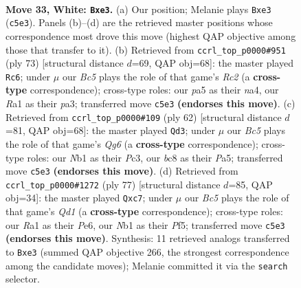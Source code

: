 \documentclass[11pt]{article}
\begin{document}
\clearpage

\begin{figure}[p]\centering
\begin{subfigure}{0.46\textwidth}\centering
\resizebox{\linewidth}{!}{%
\newchessgame
\chessboard[
  setfen={rnb1k3/8/5R2/p1Bp4/1p6/4q3/PPP3P1/RN4K1 w - - 0 33},
  showmover=false,
  pgfstyle=straightmove, color=movearrow, markmove={c5-e3}
]}
\caption{}
\end{subfigure}\hfill
\begin{subfigure}{0.46\textwidth}\centering
\resizebox{\linewidth}{!}{%
\newchessgame
\chessboard[
  setfen={8/1kr5/p5p1/3Q4/N2b1PPp/P3p2P/3P3K/5r2 b - - 7 37},
  showmover=false,
  pgfstyle=straightmove, color=movearrow, markmove={c7-c6}
]}
\caption{}
\end{subfigure}
\\[4pt]
\begin{subfigure}{0.46\textwidth}\centering
\resizebox{\linewidth}{!}{%
\newchessgame
\chessboard[
  setfen={5r1k/p7/5pQ1/Pp2p3/2q5/2P3P1/4KP2/R7 w - - 1 32},
  showmover=false,
  pgfstyle=straightmove, color=movearrow, markmove={g6-d3}
]}
\caption{}
\end{subfigure}\hfill
\begin{subfigure}{0.46\textwidth}\centering
\resizebox{\linewidth}{!}{%
\newchessgame
\chessboard[
  setfen={3q4/ppQ4k/4p2p/5pnB/1P1P4/P3r3/2R3P1/6K1 b - - 1 39},
  showmover=false,
  pgfstyle=straightmove, color=movearrow, markmove={d8-c7}
]}
\caption{}
\end{subfigure}
\caption{\textbf{Move 33, White: \texttt{Bxe3}.} (a) Our position; Melanie plays \texttt{Bxe3} (\texttt{c5e3}). Panels (b)--(d) are the retrieved master positions whose correspondence most drove this move (highest QAP objective among those that transfer to it). (b) Retrieved from \texttt{ccrl\_top\_p0000\#951} (ply 73) [structural distance $d$=69, QAP obj=68]: the master played \texttt{Rc6}; under $\mu$ our \emph{Bc5} plays the role of that game's \emph{Rc2} (a \textbf{cross-type} correspondence); cross-type roles: our \emph{p}a5 as their \emph{n}a4, our \emph{R}a1 as their \emph{p}a3; transferred move \texttt{c5e3} \textbf{(endorses this move)}. (c) Retrieved from \texttt{ccrl\_top\_p0000\#109} (ply 62) [structural distance $d$=81, QAP obj=68]: the master played \texttt{Qd3}; under $\mu$ our \emph{Bc5} plays the role of that game's \emph{Qg6} (a \textbf{cross-type} correspondence); cross-type roles: our \emph{N}b1 as their \emph{P}c3, our \emph{b}c8 as their \emph{P}a5; transferred move \texttt{c5e3} \textbf{(endorses this move)}. (d) Retrieved from \texttt{ccrl\_top\_p0000\#1272} (ply 77) [structural distance $d$=85, QAP obj=34]: the master played \texttt{Qxc7}; under $\mu$ our \emph{Bc5} plays the role of that game's \emph{Qd1} (a \textbf{cross-type} correspondence); cross-type roles: our \emph{R}a1 as their \emph{P}e6, our \emph{N}b1 as their \emph{P}f5; transferred move \texttt{c5e3} \textbf{(endorses this move)}. Synthesis: 11 retrieved analogs transferred to \texttt{Bxe3} (summed QAP objective 266, the strongest correspondence among the candidate moves); Melanie committed it via the \texttt{search} selector.}
\label{fig:thought-m64}
\end{figure}
\end{document}
